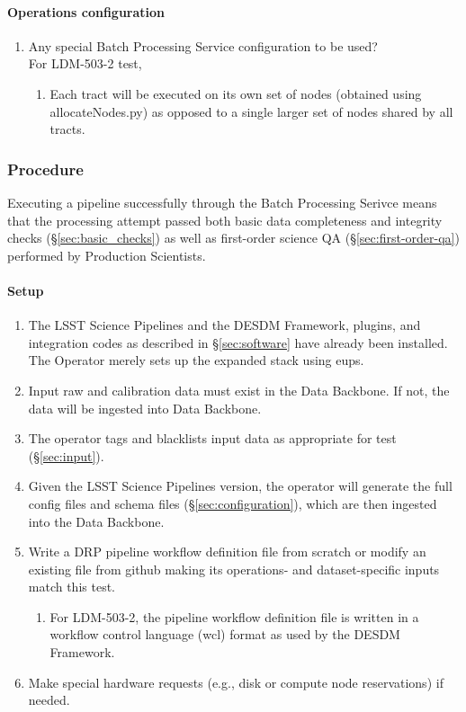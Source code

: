 \paragraph{Operations configuration}
\begin{enumerate}
    \item{Any special Batch Processing Service configuration to be used?} \\
    For LDM-503-2 test,
    \begin{enumerate}
        \item{Each tract will be executed on its own set of nodes (obtained using allocateNodes.py) as opposed to a single larger set of nodes shared by all tracts.}
    \end{enumerate}

\end{enumerate}

\subsubsection{Procedure}

Executing a pipeline successfully through the Batch Processing
Serivce means that the processing attempt passed both basic data
completeness and integrity checks (\S\ref{sec:basic_checks}) as well as first-order science
QA (\S\ref{sec:first-order-qa}) performed by Production Scientists.


\paragraph{Setup}
\begin{enumerate}
  \item{The LSST Science Pipelines and the DESDM Framework, plugins, and integration codes as described in \S\ref{sec:software} have already been installed.   The Operator merely sets up the expanded stack using eups.}
  \item{Input raw and calibration data must exist in the Data Backbone. If not, the data will be ingested into Data Backbone.}  
  \item{The operator tags and blacklists input data as appropriate for test (\S\ref{sec:input}).}
  \item{Given the LSST Science Pipelines version, the operator will generate the full config files and schema files (\S\ref{sec:configuration}), which are then ingested into the Data Backbone.}

  \item{Write a DRP pipeline workflow definition file from scratch or modify an existing file from github making its operations- and dataset-specific inputs match this test.}

  \begin{enumerate}
    \item{For LDM-503-2, the pipeline workflow definition file is written in a workflow control language (wcl) format as used by the DESDM Framework.}
  \end{enumerate}
  \item{Make special hardware requests (e.g., disk or compute node reservations) if needed.}
\end{enumerate}

